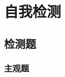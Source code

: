 \documentclass[color=blue]{textbook-cn}%
\begin{document}
%
%
%
%
%
%
%
%
%

\partintro{\zhlipsum[1]}
\part*{自我检测}


\begin{Quiz}
\chapter{检测题}


\section{主观题}
\end{Quiz}
\end{document}
